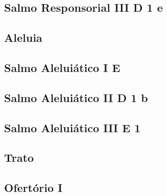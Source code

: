 \subsection[Salmo Responsorial III]{Salmo Responsorial III \textmd{D 1 e}}\label{subsection:liturgia-defunctorum/missa-pro-defunctis/psalmus-responsorius-3}

\subsection{Aleluia}\label{subsection:liturgia-defunctorum/missa-pro-defunctis/alleluia}
\def\AntiphonScore{alleluia.4E.2/}

\subsection[Salmo Aleluiático I]{Salmo Aleluiático I \textmd{E \protect\GreStar}}\label{subsection:liturgia-defunctorum/missa-pro-defunctis/psalmus-alleluiaticus-1}

\AllowPageFlush

\subsection[Salmo Aleluiático II]{Salmo Aleluiático II \textmd{D 1 b}}\label{subsection:liturgia-defunctorum/missa-pro-defunctis/psalmus-alleluiaticus-2}

\AllowPageFlush

\subsection[Salmo Aleluiático III]{Salmo Aleluiático III \textmd{E 1}}\label{subsection:liturgia-defunctorum/missa-pro-defunctis/psalmus-alleluiaticus-3}

\subsection{Trato}\label{subsection:liturgia-defunctorum/missa-pro-defunctis/tractus}

\subsection{Ofertório I}\label{subsection:liturgia-defunctorum/missa-pro-defunctis/offertorium-1}
\def\AntiphonAnnotation{\CantusID[?]{004588}[Jó 19,25] \\ Adaptado originalmente por Lincoln Haas Hein}
\def\AntiphonScore{redemptor-meus-vivit.2D/}

